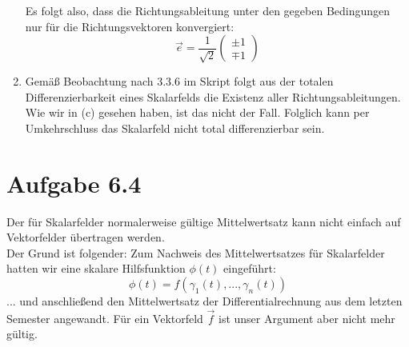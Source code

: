 \documentclass[a4paper,german,12pt,smallheadings]{scrartcl}
\begin{document}
\begin{enumerate}[(1)]
Es folgt also, dass die Richtungsableitung unter den gegeben Bedingungen nur für die Richtungsvektoren konvergiert:
\begin{equation*}
\vec{e}=\frac{1}{\sqrt{2}}\begin{pmatrix}
\pm1\\\mp1
\end{pmatrix}
\end{equation*}

\item Gemäß Beobachtung nach 3.3.6 im Skript folgt aus der totalen Differenzierbarkeit eines Skalarfelds die Existenz aller Richtungsableitungen. Wie wir in (c) gesehen haben, ist das nicht der Fall. Folglich kann per Umkehrschluss das Skalarfeld nicht total differenzierbar sein.

\end{enumerate}

\section*{Aufgabe 6.4}
Der für Skalarfelder normalerweise gültige Mittelwertsatz kann nicht einfach auf Vektorfelder übertragen werden.\\
Der Grund ist folgender: Zum Nachweis des Mittelwertsatzes für Skalarfelder hatten wir eine skalare Hilfsfunktion $\phi(t)$ eingeführt:
\begin{equation*}
\phi(t)=f\left(\gamma_1(t),...,\gamma_n(t)\right)
\end{equation*}
... und anschließend den Mittelwertsatz der Differentialrechnung aus dem letzten Semester angewandt. Für ein Vektorfeld $\vec{f}$ ist unser Argument aber nicht mehr gültig.\\
\end{document}
